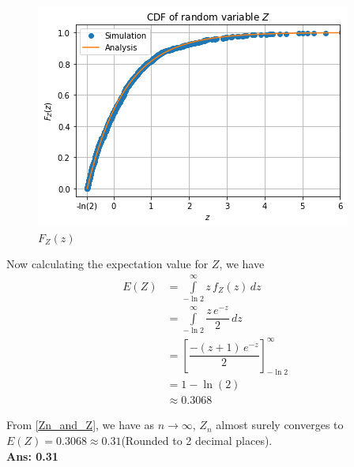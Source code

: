 \documentclass[journal,12pt,twocolumn]{IEEEtran}
\begin{document}
\begin{figure}[H]
    \centering
      \includegraphics[width=\columnwidth]{Figures/CDF_Z.png}
     \caption{$F_Z(z)$}
\end{figure}
Now calculating the expectation value for $Z$, we have
\begin{align}
    E(Z)&=\int\limits_{-\ln{2}}^{\infty}z\,f_Z(z)\,dz\\
    &=\int\limits_{-\ln{2}}^{\infty}\dfrac{z\,e^{-z}}{2}\,dz\\
    &=\left[ \dfrac{-(z+1)\,e^{-z}}{2} \right]_{-\ln{2}}^\infty\\
    &=1-\ln{(2)}\\
    &\approx0.3068
\end{align}
\par From \eqref{Zn_and_Z}, we have as $n \to \infty$, $Z_n$  almost surely converges to $ E(Z)=0.3068\approx0.31$(Rounded to 2 decimal places).\\
\textbf{Ans: 0.31}
\end{document}
